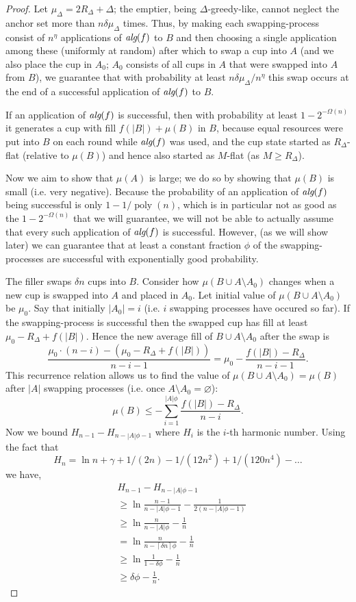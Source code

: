 \documentclass[twocolumn]{article}[10pt]
\DeclareMathOperator{\poly}{\text{poly}}
\newcommand{\alg}[1]{\textit{\text{alg}}({#1})}
\newcommand{\ceil}[1]{\left\lceil #1 \right\rceil}
\begin{document}
\begin{proof}
  Let $\mu_\Delta = 2R_\Delta + \Delta$; the emptier, being
  $\Delta$-greedy-like, cannot neglect the anchor set more than
  $n\delta\mu_\Delta$ times. Thus, by making each
  swapping-process consist of $n^{\eta}$ applications of $\alg{f}$
  to $B$ and then choosing a single application among these
  (uniformly at random) after which to swap a cup into $A$ (and
  we also place the cup in $A_0$; $A_0$ consists of all cups in
  $A$ that were swapped into $A$ from $B$), we guarantee that
  with probability at least $n\delta\mu_\Delta/n^{\eta}$ this swap
  occurs at the end of a successful application of $\alg{f}$ to $B$. 

  If an application of $\alg{f}$ is successful, then with
  probability at least $1-2^{-\Omega(n)}$ it generates a cup with
  fill $f(|B|) + \mu(B)$ in $B$, because equal resources were put
  into $B$ on each round while $\alg{f}$ was used, and the cup
  state started as $R_\Delta$-flat (relative to $\mu(B)$) and
  hence also started as $M$-flat (as $M\ge R_\Delta$).

  Now we aim to show that $\mu(A)$ is large; we do so by showing
  that $\mu(B)$ is small (i.e. very negative). Because the
  probability of an application of $\alg{f}$ being successful is
  only $1-1/\poly(n)$, which is in particular not as good as the
  $1-2^{-\Omega(n)}$ that we will guarantee, we will not be able
  to actually assume that every such application of $\alg{f}$ is
  successful. However, (as we will show later) we can guarantee
  that at least a constant fraction $\phi$ of the
  swapping-processes are successful with
  exponentially good probability.

  The filler swaps $\delta n$ cups into $B$. 
  Consider how $\mu(B \cup A\setminus A_0)$ changes when a new
  cup is swapped into $A$ and placed in $A_0$. Let initial value
  of $\mu(B \cup A\setminus A_0)$ be $\mu_0$. Say that
  initially $|A_0| = i$ (i.e. $i$ swapping processes have occured
  so far). If the swapping-process is successful then the swapped cup has
  fill at least $\mu_0 - R_\Delta + f(|B|)$. Hence the new
  average fill of $B \cup A\setminus A_0$ after the swap is
  $$\frac{\mu_0\cdot (n-i) - (\mu_0 - R_\Delta + f(|B|))}{n-i-1} =
  \mu_0 - \frac{f(|B|) - R_\Delta}{n-i-1}.$$
  This recurrence relation allows us to find the value of
  $\mu(B \cup A\setminus A_0) = \mu(B)$ after $|A|$ swapping
  processes (i.e. once $A\setminus A_0 = \varnothing$):
  $$\mu(B) \le -\sum_{i=1}^{|A|\phi} \frac{f(|B|)-R_\Delta}{n-i}.$$
  Now we bound $H_{n-1} - H_{n-|A|\phi-1}$ where $H_i$ is the $i$-th harmonic number.
  Using the fact that 
  $$H_n = \ln n + \gamma + 1/(2n) - 1/(12 n^2) + 1/(120 n^4) - \ldots$$
  we have,
  \begin{align*}
    &H_{n-1} - H_{n-|A|\phi-1}\\
  &\ge \ln \frac{n-1}{n-|A|\phi-1} - \frac{1}{2(n-|A|\phi-1)}\\
  &\ge \ln \frac{n}{n-|A|\phi} - \frac{1}{n}\\
  &= \ln \frac{n}{n-\ceil{\delta n}\phi} - \frac{1}{n}\\
  &\ge \ln \frac{1}{1-\delta\phi} - \frac{1}{n}\\
  &\ge \delta\phi - \frac{1}{n}.
  \end{align*}


\end{proof}
\end{document}
